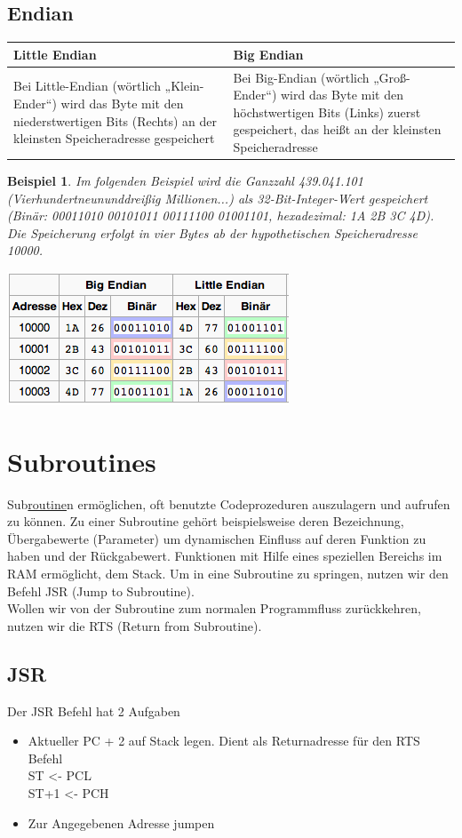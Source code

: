 \documentclass[a4paper,10pt]{report}
\newtheorem{myexample}{Beispiel}
\begin{document}
\subsection{Endian}
\begin{tabularx}{\columnwidth}{X|X}
Little Endian & Big Endian\\ \hline
Bei Little-Endian (wörtlich „Klein-Ender“) wird das Byte mit den niederstwertigen Bits (Rechts) an der kleinsten Speicheradresse gespeichert &Bei Big-Endian (wörtlich „Groß-Ender“) wird das Byte mit den höchstwertigen Bits (Links) zuerst gespeichert, das heißt an der kleinsten Speicheradresse
\end{tabularx}
\begin{myexample}
Im folgenden Beispiel wird die Ganzzahl 439.041.101 (Vierhundertneununddreißig Millionen...) als 32-Bit-Integer-Wert gespeichert (Binär: 00011010 00101011 00111100 01001101, hexadezimal: 1A 2B 3C 4D). Die Speicherung erfolgt in vier Bytes ab der hypothetischen Speicheradresse 10000.
\begin{center}\includegraphics[scale=0.6]{imgs/endians.png}\end{center}
\end{myexample}
\newpage
\section{Subroutines}
Sub\underline{routine}n ermöglichen, oft benutzte Codeprozeduren auszulagern und aufrufen zu können. Zu einer Subroutine gehört beispielsweise deren Bezeichnung, Übergabewerte (Parameter) um dynamischen Einfluss auf deren Funktion zu haben und der Rückgabewert. Funktionen mit Hilfe eines speziellen Bereichs im RAM ermöglicht, dem Stack. Um in eine Subroutine zu springen, nutzen wir den Befehl JSR (Jump to Subroutine).\\
Wollen wir von der Subroutine zum normalen Programmfluss zurückkehren, nutzen wir die RTS (Return from Subroutine).
\subsection{JSR}
Der JSR Befehl hat 2 Aufgaben
	\begin{itemize}
		\item Aktueller PC + 2 auf Stack legen. Dient als Returnadresse für den RTS Befehl\\
			ST <- PCL\\
			ST+1 <- PCH
		\item
			Zur Angegebenen Adresse jumpen
	\end{itemize}
\end{document}
